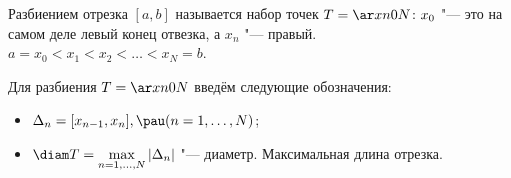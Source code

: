 
 	Разбиением отрезка $[a,b]$ называется набор точек $T=\ar xn0N\colon x_0$ "---
 	это на самом деле левый конец отвезка, а $x_n$ "--- правый. $a=x_0<x_1<x_2<\ldots<x_N=b$.
 	
 	Для разбиения $T=\ar xn0N$ введём следующие обозначения:
 	\begin{itemize}
 	  \item $\Delta_n=[x_{n-1},x_n],\pau (n=1,\ldots,N)$;
 	  \item $\diam T=\max\limits_{n=1,\ldots,N}|\Delta_n|$ "--- диаметр. Максимальная длина отрезка.
 	\end{itemize}
 